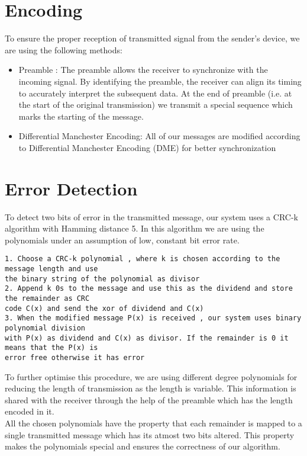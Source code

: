 \documentclass[11pt]{article}
\begin{document}
\maketitle
\section{Encoding}
To ensure the proper reception of transmitted signal from the sender's device, we are using the following methods:
\begin{itemize}
    \item Preamble : The preamble allows the receiver to synchronize with the incoming signal. By identifying the preamble, the receiver can align its timing to accurately interpret the subsequent data. At the end of preamble (i.e. at the start of the original transmission) we transmit a special sequence which marks the starting of the message.

    \item Differential Manchester Encoding: All of our messages are modified according to Differential Manchester Encoding (DME) for better synchronization


\end{itemize}
\section{Error Detection}
To detect two bits of error in the transmitted message, our system uses a CRC-k algorithm with Hamming distance 5. In this algorithm we are using the polynomials under an assumption of low, constant bit error rate.
\begin{tcolorbox}[colback=black!10!white, colframe=black, title=Error Detection Algorithm ]
    \begin{verbatim}
1. Choose a CRC-k polynomial , where k is chosen according to the message length and use
the binary string of the polynomial as divisor
2. Append k 0s to the message and use this as the dividend and store the remainder as CRC 
code C(x) and send the xor of dividend and C(x)
3. When the modified message P(x) is received , our system uses binary polynomial division
with P(x) as dividend and C(x) as divisor. If the remainder is 0 it means that the P(x) is 
error free otherwise it has error\end{verbatim}
\end{tcolorbox}
To further optimise this procedure, we are using different degree polynomials for reducing the length of transmission as the length is variable. This information is shared with the receiver through the help of the preamble which has the length encoded in it. \\
All the chosen polynomials have the property that each remainder is mapped to a single transmitted message which has its atmost two bits altered. This property makes the polynomials special and ensures the correctness of our algorithm.
\end{document}
